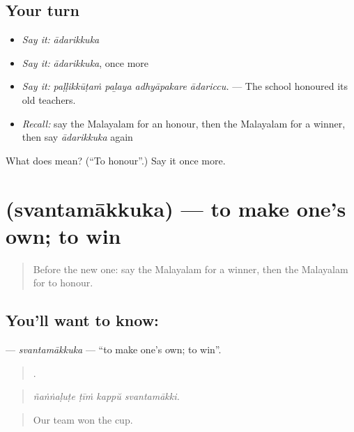 \subsection*{Your turn}
\begin{itemize}
\raggedright
  \item \emph{Say it:} \emph{ādarikkuka}
  \item \emph{Say it:} \emph{ādarikkuka}, once more
  \item \emph{Say it:} \emph{paḷḷikkūṭaṁ paḻaya adhyāpakare ādariccu.} — The school honoured its old teachers.
  \item \emph{Recall:} say the Malayalam for an honour, then the Malayalam for a winner, then say \emph{ādarikkuka} again
\end{itemize}

\begin{tcolorbox}[breakable,colback=teal!4,colframe=teal!35!black,title={Before you move on}]
What does  mean? (\textquotedblleft{}To honour\textquotedblright{}.) Say it once more.
\end{tcolorbox}
\section[\texorpdfstring{\ml{സ്വന്തമാക്കുക} (svantamākkuka)}{സ്വന്തമാക്കുക (svantamākkuka)}]{ (svantamākkuka) — to make one's own; to win}

\label{lesson:ML-C396-svantamakkuka}



\begin{quote}
Before the new one: say the Malayalam for a winner, then the Malayalam for to honour.
\end{quote}

\subsection*{You'll want to know: }
\textbf{} — \emph{svantamākkuka} — \textquotedblleft{}to make one's own; to win\textquotedblright{}.

\begin{quote}
   .
\end{quote}

\begin{quote}
\emph{ñaṅṅaḷuṭe ṭīṁ kappŭ svantamākki.}
\end{quote}

\begin{quote}
Our team won the cup.
\end{quote}

